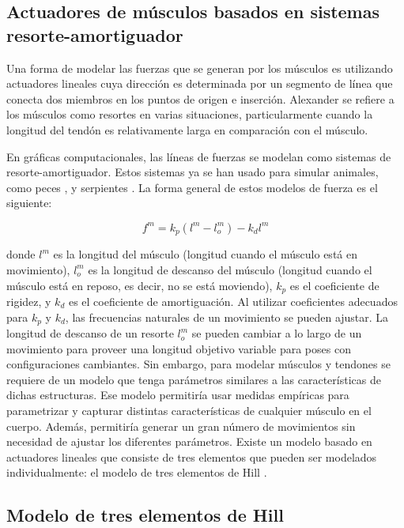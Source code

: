 \subsection{Actuadores de músculos basados en sistemas resorte-amortiguador}

Una forma de modelar las fuerzas que se generan por los músculos es utilizando actuadores lineales cuya dirección es determinada por un segmento de línea que conecta dos miembros en los puntos de origen e inserción. Alexander \citep{alexander1990three} se refiere a los músculos como resortes en varias situaciones, particularmente cuando la longitud del tendón es relativamente larga en comparación con el músculo.

En gráficas computacionales, las líneas de fuerzas se modelan como sistemas de resorte-amortiguador. Estos sistemas ya se han usado para simular animales, como peces \citep{tu1994artificial}, y serpientes \citep{miller1988motion}. La forma general de estos modelos de fuerza es el siguiente:

\begin{equation}
	f^m = k_p(l^m-l_o^m)-k_d l^m
\end{equation}

donde $l^m$ es la longitud del músculo (longitud cuando el músculo está en movimiento), $l_o^m$ es la longitud de descanso del músculo (longitud cuando el músculo está en reposo, es decir, no se está moviendo), $k_p$ es el coeficiente de rigidez, y $k_d$ es el coeficiente de amortiguación. Al utilizar coeficientes adecuados para $k_p$ y $k_d$, las frecuencias naturales de un movimiento se pueden ajustar. La longitud de descanso de un resorte $l_o^m$ se pueden cambiar a lo largo de un movimiento para proveer una longitud objetivo variable para poses con configuraciones cambiantes. Sin embargo, para modelar músculos y tendones se requiere de un modelo que tenga parámetros similares a las características de dichas estructuras. Ese modelo permitiría usar medidas empíricas para parametrizar y capturar distintas características de cualquier músculo en el cuerpo. Además, permitiría generar un gran número de movimientos sin necesidad de ajustar los diferentes parámetros. Existe un modelo basado en actuadores lineales que consiste de tres elementos que pueden ser modelados individualmente: el modelo de tres elementos de Hill \citep{hill1970first}.

\subsection{Modelo de tres elementos de Hill}

